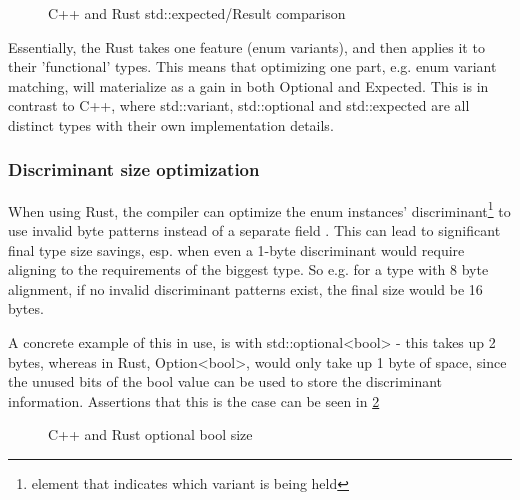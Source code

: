 \documentclass[
    english, %
]{VUMIFPSkursinis}
\begin{document}
\begin{figure}[!htbp]
    \begin{minipage}{0.55\textwidth}
        \centering
    \end{minipage}
    \begin{minipage}{0.45\textwidth}
        \centering
    \end{minipage}
    \caption{C++ and Rust std::expected/Result comparison}
    \label{fig:expected_comparison}
\end{figure}

Essentially, the Rust takes one feature (enum variants), and then applies it to their 'functional' types. This means that optimizing one part, e.g. enum variant matching, will materialize as a gain in both Optional and Expected. This is in contrast to C++, where std::variant, std::optional and std::expected are all distinct types with their own implementation details.

\FloatBarrier
\subsubsection{Discriminant size optimization}

When using Rust, the compiler can optimize the enum instances' discriminant\footnote{element that indicates which variant is being held} to use invalid byte patterns instead of a separate field \cite{RustReference}. This can lead to significant final type size savings, esp. when even a 1-byte discriminant would require aligning to the requirements of the biggest type. So e.g. for a type with 8 byte alignment, if no invalid discriminant patterns exist, the final size would be 16 bytes.

A concrete example of this in use, is with std::optional<bool> - this takes up 2 bytes, whereas in Rust, Option<bool>, would only take up 1 byte of space, since the unused bits of the bool value can be used to store the discriminant information. Assertions that this is the case can be seen in \cref{fig:optional_bool_size}

\begin{figure}[!htbp]
    \begin{minipage}{0.5\textwidth}
        \centering
    \end{minipage}
    \begin{minipage}{0.5\textwidth}
        \centering
    \end{minipage}
    \caption{C++ and Rust optional bool size}
    \label{fig:optional_bool_size}
\end{figure}
\end{document}
